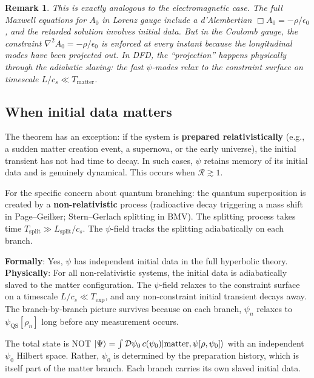 \documentclass[12pt,a4paper]{article}
\newtheorem{remark}{Remark}[section]
\begin{document}
\begin{remark}
This is exactly analogous to the electromagnetic case. The full Maxwell
equations for $A_0$ in Lorenz gauge include a d'Alembertian
$\Box A_0 = -\rho/\epsilon_0$, and the retarded solution involves initial
data. But in the Coulomb gauge, the constraint $\nabla^2 A_0 = -\rho/\epsilon_0$
is enforced at every instant because the longitudinal modes have been
projected out. In DFD, the ``projection'' happens physically through the
adiabatic slaving: the fast $\psi$-modes relax to the constraint surface
on timescale $L/c_s \ll T_\mathrm{matter}$.
\end{remark}

\subsection{When initial data matters}

The theorem has an exception: if the system is \textbf{prepared
relativistically} (e.g., a sudden matter creation event, a supernova,
or the early universe), the initial transient has not had time to decay.
In such cases, $\psi$ retains memory of its initial data and is genuinely
dynamical. This occurs when $\mathcal{R} \gtrsim 1$.

For the specific concern about quantum branching: the quantum superposition
is created by a \textbf{non-relativistic} process (radioactive decay
triggering a mass shift in Page--Geilker; Stern--Gerlach splitting in BMV).
The splitting process takes time $T_\mathrm{split} \gg L_\mathrm{split}/c_s$.
The $\psi$-field tracks the splitting adiabatically on each branch.

\begin{tcolorbox}[colback=green!5!white, colframe=dfdgreen,
title=Answer to Q1]
\textbf{Formally}: Yes, $\psi$ has independent initial data in the
full hyperbolic theory. \textbf{Physically}: For all non-relativistic
systems, the initial data is adiabatically slaved to the matter
configuration. The $\psi$-field relaxes to the constraint surface on a
timescale $L/c_s \ll T_\mathrm{exp}$, and any non-constraint initial
transient decays away. The branch-by-branch picture survives because on
each branch, $\psi_n$ relaxes to $\psi_\mathrm{QS}[\rho_n]$ long
before any measurement occurs.

The total state is NOT
$|\Psi\rangle = \int\mathcal{D}\psi_0\,c(\psi_0)
|{\rm matter}, \psi[\rho,\psi_0]\rangle$
with an independent $\psi_0$ Hilbert space. Rather, $\psi_0$ is
determined by the preparation history, which is itself part of the
matter branch. Each branch carries its own slaved initial data.
\end{tcolorbox}
\end{document}
